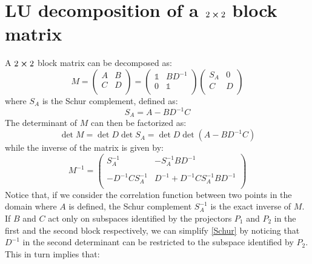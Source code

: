 \chapter{LU decomposition of a $2 \cross 2$ block matrix}
\label{app: LU decomp}

A $2 \cross 2$ block matrix can be decomposed as:
\begin{equation}
        M = \begin{pmatrix}
        A & B \\
        C & D \\
\end{pmatrix} = \begin{pmatrix}
    \mathbb{1} & BD^{-1} \\
    0 & \mathbb{1} \\ 
\end{pmatrix} \begin{pmatrix}
    S_A & 0 \\
    C & D \\
\end{pmatrix}
\end{equation}
where $S_A$ is the Schur complement, defined as:
\begin{equation}
    S_A = A - BD^{-1}C
\end{equation}
The determinant of $M$ can then be factorized as:
\begin{equation}\label{Schur}
    \det M = \det D \det S_A = \det D \det \left( A - BD^{-1}C \right)
\end{equation}
while the inverse of the matrix is given by:
\begin{equation}\label{matrix inverse}
   M^{-1} = \begin{pmatrix}
        S_A^{-1} & -S_A^{-1}BD^{-1} \\
        \\
        -D^{-1}CS_A^{-1} & D^{-1} + D^{-1}CS_A^{-1}BD^{-1} \\
    \end{pmatrix}
\end{equation}
Notice that, if we consider the correlation function between two points in the domain where $A$ is defined, the Schur complement $S_A^{-1}$ is the exact inverse of $M$. 
\\ If $B$ and $C$ act only on subspaces identified by the projectors $P_1$ and $P_2$ in the first and the second block respectively, we can simplify \eqref{Schur} by noticing that $D^{-1}$ in the second determinant can be restricted to the subspace identified by $P_2$.
\\ This in turn implies that:
